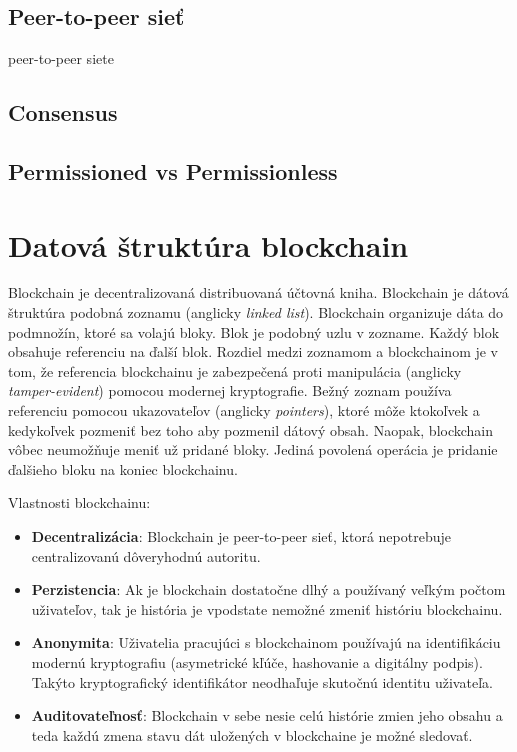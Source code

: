 \subsection{Peer-to-peer sieť}
peer-to-peer siete
\subsection{Consensus}
\subsection{Permissioned vs Permissionless}

\section{Datová štruktúra blockchain}
Blockchain je decentralizovaná distribuovaná účtovná kniha. Blockchain je dátová štruktúra podobná zoznamu (anglicky \textit{linked list}). Blockchain organizuje dáta do podmnožín, ktoré sa volajú bloky. Blok je podobný uzlu v zozname. Každý blok obsahuje referenciu na ďalší blok. Rozdiel medzi zoznamom a blockchainom je v tom, že referencia blockchainu je zabezpečená proti manipulácia (anglicky \textit{tamper-evident}) pomocou modernej kryptografie. Bežný zoznam používa referenciu pomocou ukazovateľov (anglicky \textit{pointers}), ktoré môže ktokoľvek a kedykoľvek pozmeniť bez toho aby pozmenil dátový obsah. Naopak, blockchain vôbec neumožňuje meniť už pridané bloky. Jediná povolená operácia je pridanie ďalšieho bloku na koniec blockchainu.~\cite{horizenAcademy}

Vlastnosti blockchainu:
\begin{itemize}
	\item \textbf{Decentralizácia}: Blockchain je peer-to-peer sieť, ktorá nepotrebuje centralizovanú dôveryhodnú autoritu.
	\item \textbf{Perzistencia}: Ak je blockchain dostatočne dlhý a používaný veľkým počtom uživateľov, tak je história je vpodstate nemožné zmeniť históriu blockchainu. 
	\item \textbf{Anonymita}: Uživatelia pracujúci s blockchainom používajú na identifikáciu modernú kryptografiu (asymetrické kľúče, hashovanie a digitálny podpis). Takýto kryptografický identifikátor neodhaľuje skutočnú identitu uživateľa.
	\item \textbf{Auditovateľnosť}: Blockchain v sebe nesie celú histórie zmien jeho obsahu a teda každú zmena stavu dát uložených v blockchaine je možné sledovať.
\end{itemize}

